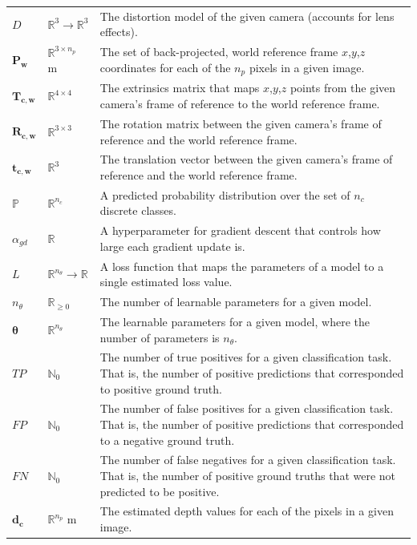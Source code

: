 \documentclass[12pt]{article}
\begin{document}
\begin{longtable*}{l l p{12cm}}
\\
$D$ & $\mathbb{R}^{3}\rightarrow{}\mathbb{R}^{3}$ & The distortion model of the given camera (accounts for lens effects).
\\
$\mathbf{P_w}$ & $\mathbb{R}^{3\times{}n_p}$ m & The set of back-projected, world reference frame $x$,$y$,$z$ coordinates for each of the $n_p$ pixels in a given image.
\\
$\mathbf{T_{c,w}}$ & $\mathbb{R}^{4\times{}4}$ & The extrinsics matrix that maps $x$,$y$,$z$ points from the given camera's frame of reference to the world reference frame.
\\ 
$\mathbf{R_{c,w}}$ & $\mathbb{R}^{3\times3}$ & The rotation matrix between the given camera's frame of reference and the world reference frame.
\\
$\mathbf{t_{c,w}}$ & $\mathbb{R}^{3}$ & The translation vector between the given camera's frame of reference and the world reference frame.
\\
$\mathbb{P}$ & $\mathbb{R}^{n_c}$ & A predicted probability distribution over the set of $n_c$ discrete classes.
\\
$\alpha_{gd}$ & $\mathbb{R}$ & A hyperparameter for gradient descent that controls how large each gradient update is.
\\
$L$ & $\mathbb{R}^{n_\theta}\rightarrow\mathbb{R}$ & A loss function that maps the parameters of a model to a single estimated loss value.
\\
$n_{\theta}$ & $\mathbb{R}_{\geq0}$ & The number of learnable parameters for a given model.
\\
$\mathbf{\theta}$ & $\mathbb{R}^{n_\theta}$ & The learnable parameters for a given model, where the number of parameters is $n_\theta$.
\\
$\mathit{TP}$ & $\mathbb{N}_{0}$ & The number of true positives for a given classification task. That is, the number of positive predictions that corresponded to positive ground truth.
\\
$\mathit{FP}$ & $\mathbb{N}_{0}$ & The number of false positives for a given classification task. That is, the number of positive predictions that corresponded to a negative ground truth.
\\
$\mathit{FN}$ & $\mathbb{N}_{0}$ & The number of false negatives for a given classification task. That is, the number of positive ground truths that were not predicted to be positive.
\\
$\mathbf{d_{c}}$ & $\mathbb{R}^{n_p}$ m & The estimated depth values for each of the pixels in a given image.

\end{longtable*}
\end{document}
